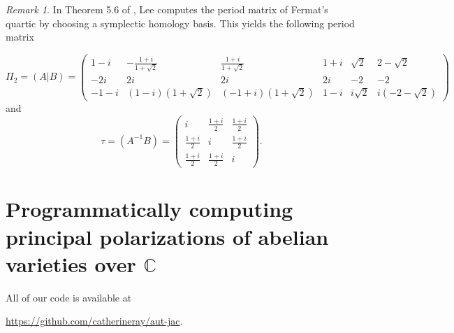 \documentclass[12pt,reqno]{amsart}
\theoremstyle{definition}
\theoremstyle{remark}
\newtheorem*{remark}{Remark}
\begin{document}

 
\begin{remark} In Theorem 5.6 of \cite{dthesis}, Lee computes the period matrix of Fermat's quartic by choosing a symplectic homology basis. This yields the following period matrix

$$\Pi_2 = (A|B) = \begin{pmatrix}  1 - i& -\frac{1 + i}{1 + \sqrt{2}}& \frac{1 + i}{1 + \sqrt{2}}& 1 + i& \sqrt{2}& 2 - \sqrt{2} \\  -2i& 2i& 2i& 2i& -2& -2\\ -1 - i & (1 - i)(1 + \sqrt{2})& (-1 + i)(1 + \sqrt{2})& 1 - i& i\sqrt{2}& i(-2 - \sqrt{2})  \end{pmatrix} $$ and $$\tau = (A^{-1}B) = \begin{pmatrix}i & \frac{1 + i}{2} & \frac{1 + i}{2}\\
\frac{1 + i}{2} & i & \frac{1 + i}{2}\\
\frac{1 + i}{2} & \frac{1 + i}{2} & i\end{pmatrix}.$$\end{remark}






 \section{Programmatically computing principal polarizations of abelian varieties over $\mathbb{C}$}

\label{sec:computing}

\noindent All of our code is available at \begin{center}\url{https://github.com/catherineray/aut-jac}.\end{center} 
\end{document}
